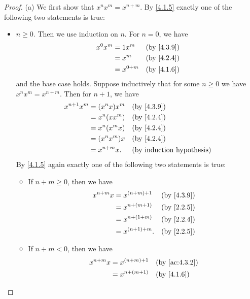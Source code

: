 \begin{proof}{(a)}
  We first show that \(x^n x^m = x^{n + m}\).
  By \cref{4.1.5} exactly one of the following two statements is true:
  \begin{itemize}
    \item \(n \geq 0\).
          Then we use induction on \(n\).
          For \(n = 0\), we have
          \begin{align*}
            x^0 x^m & = 1x^m      &  & \by{4.3.9} \\
                    & = x^m       &  & \by{4.2.4} \\
                    & = x^{0 + m} &  & \by{4.1.6}
          \end{align*}
          and the base case holds.
          Suppose inductively that for some \(n \geq 0\) we have \(x^n x^m = x^{n + m}\).
          Then for \(n + 1\), we have
          \begin{align*}
            x^{n + 1} x^m & = (x^n x) x^m  &  & \by{4.3.9} \\
                          & = x^n (x x^m)  &  & \by{4.2.4} \\
                          & = x^n (x^m x)  &  & \by{4.2.4} \\
                          & = (x^n x^m) x  &  & \by{4.2.4} \\
                          & = x^{n + m} x. &  & \byIH
          \end{align*}
          By \cref{4.1.5} again exactly one of the following two statements is true:
          \begin{itemize}
            \item If \(n + m \geq 0\), then we have
                  \begin{align*}
                    x^{n + m} x & = x^{(n + m) + 1}  &  & \by{4.3.9} \\
                                & = x^{n + (m + 1)}  &  & \by{2.2.5} \\
                                & = x^{n + (1 + m)}  &  & \by{2.2.4} \\
                                & = x^{(n + 1) + m}. &  & \by{2.2.5}
                  \end{align*}
            \item If \(n + m < 0\), then we have
                  \begin{align*}
                    x^{n + m} x & = x^{(n + m) + 1}  &  & \by{ac:4.3.2} \\
                                & = x^{n + (m + 1)}  &  & \by{4.1.6}    \\

\end{align*}
\end{itemize}
\end{itemize}
\end{proof}
